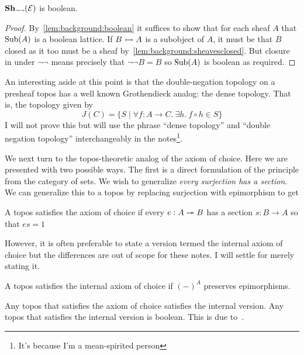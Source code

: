 \begin{lem}\label{lem:background:notnotboolean}
  $\sheaves[\neg\neg]{\Etop}$ is boolean.
\end{lem}
\begin{proof}
  By~\ref{lem:background:boolean} it suffices to show that for each
  sheaf $A$ that $\sub(A)$ is a boolean lattice. If $B \mono A$ is a
  subobject of $A$, it must be that $B$ closed as it too must be a
  sheaf by~\ref{lem:background:sheavesclosed}. But closure in under
  $\neg\neg$ means precisely that $\neg \neg B = B$ so $\sub(A)$ is
  boolean as required.
\end{proof}

An interesting aside at this point is that the double-negation
topology on a presheaf topos has a well known Grothendieck analog: the
dense topology. That is, the topology given by
\[
  J(C) = \{ S \mid \forall f : A \to C.\ \exists h.\ f \circ h \in S\}
\]
I will not prove this but will use the phrase ``dense topology'' and
``double negation topology'' interchangeably in the
notes\footnote{It's because I'm a mean-spirited person}.

We next turn to the topos-theoretic analog of the axiom of
choice. Here we are presented with two possible ways. The first is a
direct formulation of the principle from the category of sets. We wish
to generalize \emph{every surjection has a section}. We can generalize
this to a topos by replacing surjection with epimorphism to get

\begin{defn}\label{defn:background:aoc}
  A topos satisfies the axiom of choice if every $e : A \epi B$ has a
  section $s : B \to A$ so that $es = 1$
\end{defn}

However, it is often preferable to state a version termed the internal
axiom of choice but the differences are out of scope for these
notes. I will settle for merely stating it.

\begin{defn}\label{defn:background:iaoc}
  A topos satisfies the internal axiom of choice if $(-)^A$ preserves
  epimorphisms.
\end{defn}

\begin{remark}
  Any topos that satisfies the axiom of choice satisfies the internal
  version. Any topos that satisfies the internal version is
  boolean. This is due to~\citet{Diaconescu:75}.
\end{remark}

